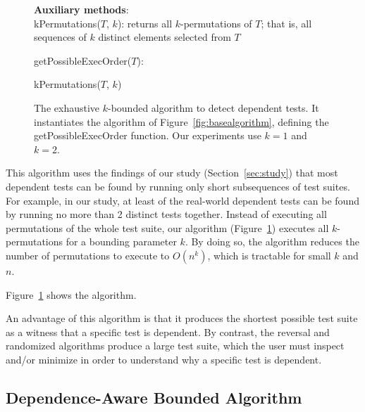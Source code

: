 \begin{figure}[t]
\textbf{Auxiliary methods}:\\
kPermutations($T$, $k$): returns all $k$-permutations of $T$; that is, all
sequences of $k$ distinct elements selected from $T$

\medskip

getPossibleExecOrder($T$):\\
\bigsqueeze
\begin{algorithmic}[1]
\RETURN kPermutations($T$, $k$)
\end{algorithmic}

\caption {The exhaustive $k$-bounded algorithm to detect dependent tests.
It instantiates the algorithm of Figure~\ref{fig:basealgorithm}, defining the
getPossibleExecOrder function.
Our experiments use $k=1$ and $k=2$.
} 
\label{fig:exhaustivealgorithm}
\smallsqueeze
\end{figure}



This algorithm uses the findings of our study
(Section~\ref{sec:study})
that most dependent tests can be found by running only short
subsequences of test suites. For example,
in our study, at least \dtrate of the real-world dependent tests
can be found by running no more than 2 distinct tests together.
Instead of executing all permutations of the
whole test suite, our algorithm (Figure~\ref{fig:exhaustivealgorithm})
executes all $k$-permutations for a bounding
parameter $k$.
By doing so, the algorithm reduces
the number of permutations to execute
to $O(n^k)$, which is tractable for small $k$ and $n$. 


Figure~\ref{fig:exhaustivealgorithm} shows the algorithm.


An advantage of this algorithm is that it produces the shortest possible 
test suite as a witness that a specific test is dependent.  By contrast,
the reversal and randomized algorithms produce a large test suite, which
the user must inspect and/or minimize in order to understand why a specific
test is dependent.

\tinysqueeze
\subsection{Dependence-Aware Bounded Algorithm}
\label{sec:advalgorithm}


